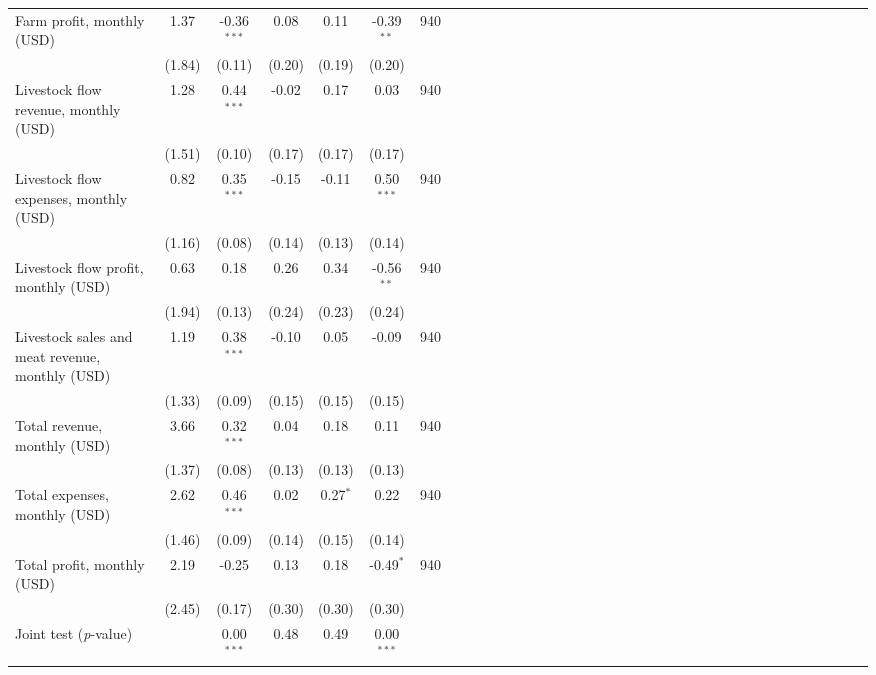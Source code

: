 {\begin{tabular}{l*{6}{SSSSSc}}
Farm profit, monthly (USD)&     1.37&-0.36$^{***}$&     0.08&     0.11&-0.39$^{**}$&      940\\
          &   (1.84)&   (0.11)&   (0.20)&   (0.19)&   (0.20)&         \\
Livestock flow revenue, monthly (USD)&     1.28&0.44$^{***}$&    -0.02&     0.17&     0.03&      940\\
          &   (1.51)&   (0.10)&   (0.17)&   (0.17)&   (0.17)&         \\
Livestock flow expenses, monthly (USD)&     0.82&0.35$^{***}$&    -0.15&    -0.11&0.50$^{***}$&      940\\
          &   (1.16)&   (0.08)&   (0.14)&   (0.13)&   (0.14)&         \\
Livestock flow profit, monthly (USD)&     0.63&     0.18&     0.26&     0.34&-0.56$^{**}$&      940\\
          &   (1.94)&   (0.13)&   (0.24)&   (0.23)&   (0.24)&         \\
Livestock sales and meat revenue, monthly (USD)&     1.19&0.38$^{***}$&    -0.10&     0.05&    -0.09&      940\\
          &   (1.33)&   (0.09)&   (0.15)&   (0.15)&   (0.15)&         \\
Total revenue, monthly (USD)&     3.66&0.32$^{***}$&     0.04&     0.18&     0.11&      940\\
          &   (1.37)&   (0.08)&   (0.13)&   (0.13)&   (0.13)&         \\
Total expenses, monthly (USD)&     2.62&0.46$^{***}$&     0.02&0.27$^{*}$&     0.22&      940\\
          &   (1.46)&   (0.09)&   (0.14)&   (0.15)&   (0.14)&         \\
Total profit, monthly (USD)&     2.19&    -0.25&     0.13&     0.18&-0.49$^{*}$&      940\\
          &   (2.45)&   (0.17)&   (0.30)&   (0.30)&   (0.30)&         \\
\midrule Joint test (\emph{p}-value)&         &0.00$^{***}$&     0.48&     0.49&0.00$^{***}$&         \\
\bottomrule
\end{tabular}
}

